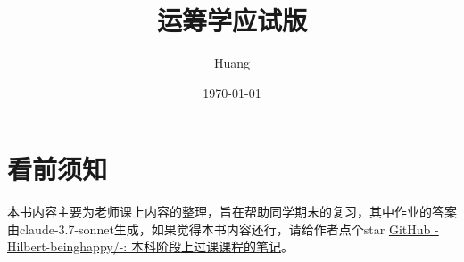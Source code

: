 \documentclass[lang=cn,10pt,thmcnt=section]{elegantbook}
\title{运筹学应试版}
\author{Huang}
\date{\today}
\begin{document}
	
	\maketitle
	\frontmatter
	
	\tableofcontents
	
	\mainmatter
	\chapter{看前须知}
	本书内容主要为老师课上内容的整理，旨在帮助同学期末的复习，其中作业的答案由claude-3.7-sonnet生成，如果觉得本书内容还行，请给作者点个star
	\href{https://github.com/Hilbert-beinghappy/-}{GitHub - Hilbert-beinghappy/-: 本科阶段上过课课程的笔记}。

	
\end{document}
